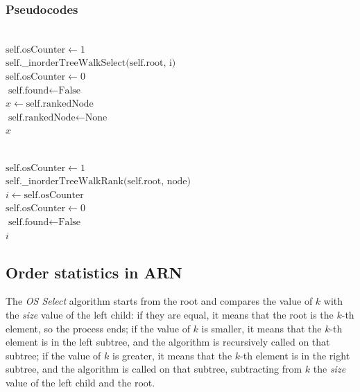 \documentclass[11pt]{article}
\begin{document}
\subsubsection{Pseudocodes}
\begin{algorithm}[H] 
\SetAlgoLined
{}
\vspace{0.5em}
 \\
\vspace{0.5em}
$\text{self.osCounter} \leftarrow 1$\\
$\text{self.\_\_inorderTreeWalkSelect(self.root, i)}$\\
$\text{self.osCounter} \leftarrow 0$\\
$\text{self.found} \leftarrow \text{False}$\\
$x \leftarrow \text{self.rankedNode}$\\
$\text{self.rankedNode} \leftarrow \text{None}$\\
\Return $x$
\end{algorithm}

\vspace{1em}

\begin{algorithm}[H] 
\SetAlgoLined
{}
\vspace{0.5em}
 \\
\vspace{0.5em}
$\text{self.osCounter} \leftarrow 1$\\
$\text{self.\_\_inorderTreeWalkRank(self.root, node)}$\\
$i \leftarrow \text{self.osCounter}$\\
$\text{self.osCounter} \leftarrow 0$\\
$\text{self.found} \leftarrow \text{False}$\\
\Return $i$
\end{algorithm}
\subsection{Order statistics in ARN} 

The \textit{OS Select} algorithm starts from the root and compares the value of \( k \) with the \textit{size} value of the left child: if they are equal, it means that the root is the \( k \)-th element, so the process ends; if the value of \( k \) is smaller, it means that the \( k \)-th element is in the left subtree, and the algorithm is recursively called on that subtree; if the value of \( k \) is greater, it means that the \( k \)-th element is in the right subtree, and the algorithm is called on that subtree, subtracting from \( k \) the \textit{size} value of the left child and the root. 
\end{document}
